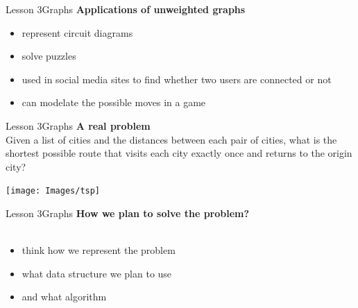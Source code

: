 \documentclass[aspectratio=1610]{beamer}
\begin{document}
\begin{frame}{Lesson 3}{Graphs}
\LARGE
\textbf{Applications of unweighted graphs}\\
\Large
\begin{itemize}
    \item represent circuit diagrams
    \item solve puzzles    
    \item used in social media sites to find whether two users are connected or not
    \item can modelate the possible moves in a game
\end{itemize}
\end{frame}


\begin{frame}{Lesson 3}{Graphs}
\LARGE
\textbf{A real problem}\\
Given a list of cities and the distances between each pair of
cities, what is the shortest possible route that visits each city
exactly once and returns to the origin city?
\begin{center}
\texttt{[image: Images/tsp]}
\end{center}
\end{frame}


\begin{frame}{Lesson 3}{Graphs}
\LARGE
\textbf{How we plan to solve the problem?}\\~\\
\begin{itemize}
    \item think how we represent the problem
    \item what data structure we plan to use
    \item and what algorithm
\end{itemize}
\end{frame}
\end{document}
